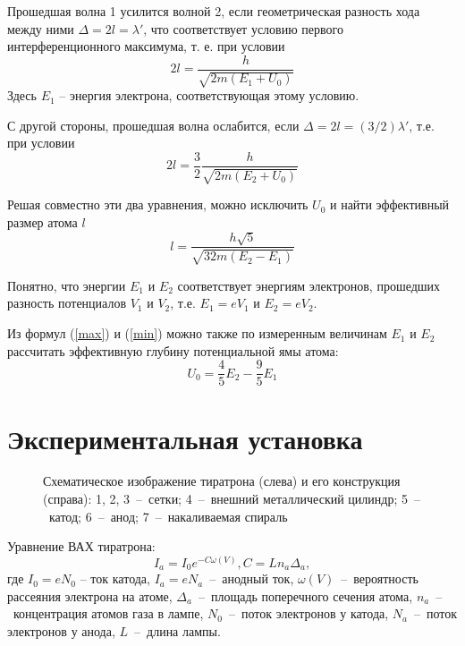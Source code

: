 \documentclass{physlab}
\begin{document}
Прошедшая волна 1 усилится волной 2, если геометрическая разность хода между ними $\Delta = 2l = \lambda'$, что соответствует условию первого интерференционного максимума, т. е. при условии
\begin{equation} \label{max}
2l = \frac{h}{\sqrt{2m(E_1 + U_0)}}
\end{equation}
Здесь $E_1$ -- энергия электрона, соответствующая этому условию.

С другой стороны, прошедшая волна ослабится, если $\Delta = 2l = (3/2)\lambda'$, т.е. при условии 
\begin{equation} \label{min}
2l = \frac{3}{2} \frac{h}{\sqrt{2m(E_2 + U_0)}}
\end{equation}

Решая совместно эти два уравнения, можно исключить $U_0$ и найти эффективный размер атома $l$
\begin{equation} \label{size}
l = \frac{h \sqrt{5}}{\sqrt{32m(E_2 - E_1)}}
\end{equation}

Понятно, что энергии $E_1$ и $E_2$ соответствует энергиям электронов, прошедших разность потенциалов $V_1$ и $V_2$, т.е. $E_1 = eV_1$ и $E_2 = eV_2$. 

Из формул (\ref{max}) и (\ref{min}) можно также по измеренным величинам $E_1$ и $E_2$ рассчитать эффективную глубину потенциальной ямы атома:
\begin{equation} \label{hole}
U_0 = \frac{4}{5} E_2 - \frac{9}{5} E_1
\end{equation}

\section{Экспериментальная установка}

\begin{figure}[H] 
\caption{Схематическое изображение тиратрона (слева) и его конструкция (справа): 1, 2, 3~--~сетки; 4~--~внешний металлический цилиндр; 5~--~катод; 6~--~анод; 7~--~накаливаемая спираль}
\label{tiratron}
\end{figure}

Уравнение ВАХ тиратрона:
\begin{equation} \label{VAH}
I_a = I_0 e^{-C\omega(V)}, C = L n_a \Delta_a,
\end{equation}
где $I_0 = e N_0$ -- ток катода, $I_a = e N_a$~--~анодный ток, $\omega(V)$~--~вероятность рассеяния электрона на атоме, $\Delta_a$~--~площадь поперечного сечения атома, $n_a$~--~концентрация атомов газа в лампе, $N_0$~--~поток электронов у катода, $N_a$~--~поток электронов у анода, $L$~--~длина лампы.
\end{document}
